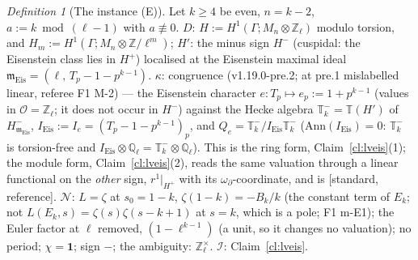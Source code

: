 \documentclass[11pt]{article}
\theoremstyle{remark}
\newtheorem{definition}[theorem]{Definition}
\newcommand{\Z}{\mathbb{Z}}
\newcommand{\Q}{\mathbb{Q}}
\newcommand{\Ga}{\Gamma}
\newcommand{\T}{\mathbb{T}}
\newcommand{\m}{\mathfrak{m}}
\newcommand{\Mn}{M_n}
\newcommand{\STD}{\textsf{[standard, reference]}}
\begin{document}
\begin{definition}[The instance (E)]\label{def:lveis}
Let $k\ge4$ be even, $n=k-2$, $a:=k\bmod(\ell-1)$ with $a\not\equiv0$. $D$: $H:=H^{1}(\Ga;\Mn\otimes\Z_\ell)$ modulo torsion, and $H_m:=H^{1}(\Ga;\Mn\otimes\Z/\ell^{m})$; $H'$:
the minus sign $H^{-}$ (cuspidal: the Eisenstein class lies in $H^{+}$) localised at the Eisenstein maximal ideal $\m_{\mathrm{Eis}}=(\ell,\,T_p-1-p^{k-1})$. $\kappa$:
\textsf{congruence} (v1.19.0-pre.2; at pre.1 mislabelled \textsf{linear}, referee F1 M-2) --- the Eisenstein character $e\colon T_p\mapsto e_p:=1+p^{k-1}$ (values in
$\mathcal O=\Z_\ell$; it does not occur in $H^{-}$) against the Hecke algebra $\T^{-}_k=\T(H')$ of $H^{-}_{\m_{\mathrm{Eis}}}$, $I_{\mathrm{Eis}}:=I_e=(T_p-1-p^{k-1})_p$, and
$Q_e=\T^{-}_k/I_{\mathrm{Eis}}\T^{-}_k$ ($\mathrm{Ann}(I_{\mathrm{Eis}})=0$: $\T^{-}_k$ is torsion-free and $I_{\mathrm{Eis}}\otimes\Q_\ell=\T^{-}_k\otimes\Q_\ell$). This is the ring form,
Claim~\ref{cl:lveis}(1); the module form, Claim~\ref{cl:lveis}(2), reads the same valuation through a \textsf{linear} functional on the \emph{other} sign, $r^{1}|_{H^{+}}$ with its
$\omega_\partial$-coordinate, and is \STD. $\mathcal N$: $L=\zeta$ at $s_0=1-k$, $\zeta(1-k)=-B_k/k$ (the constant term of $E_k$; not $L(E_k,s)=\zeta(s)\zeta(s-k+1)$ at $s=k$, which is a pole; F1 m-E1); the
Euler factor at $\ell$ removed, $(1-\ell^{k-1})$ (a unit, so it changes no valuation); no period; $\chi=\mathbf 1$; sign $-$; the ambiguity: $\Z_\ell^{\times}$.
$\mathcal I$: Claim~\ref{cl:lveis}.
\end{definition}
\end{document}
